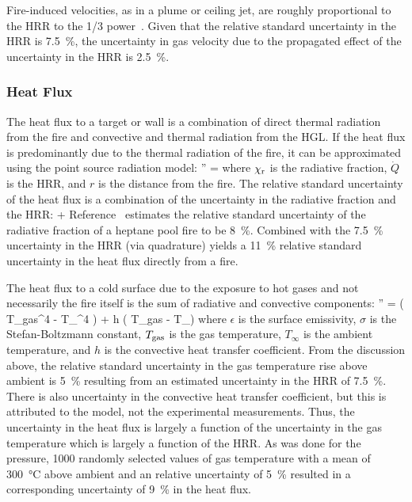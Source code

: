 Fire-induced velocities, as in a plume or ceiling jet, are roughly proportional to the HRR to the 1/3 power~\cite{SFPE:Alpert}. Given that the relative standard uncertainty in the HRR is 7.5~\%, the uncertainty in gas velocity due to the propagated effect of the uncertainty in the HRR is 2.5~\%.

\subsubsection{Heat Flux}

The heat flux to a target or wall is a combination of direct thermal radiation from the fire and convective and thermal radiation from the HGL. If the heat flux is predominantly due to the thermal radiation of the fire, it can be approximated using the point source radiation model:
\be
   '' = 
\ee
where $\chi_{\rm r}$ is the radiative fraction, $\dot{Q}$ is the HRR, and $r$ is the distance from the fire. The relative standard uncertainty of the heat flux is a combination of the uncertainty in the radiative fraction and the HRR:
\be
    \approx {} + 
\ee
Reference~\cite{Hamins:SP1013-1} estimates the relative standard uncertainty of the radiative fraction of a heptane pool fire to be 8~\%. Combined with the 7.5~\% uncertainty in the HRR (via quadrature) yields a 11~\% relative standard uncertainty in the heat flux directly from a fire.

The heat flux to a cold surface due to the exposure to hot gases and not necessarily the fire itself is the sum of radiative and convective components:
\be
   '' = \epsilon \sigma \left( T_{\rm gas}^4 - T_\infty^4 \right) + h \left( T_{\rm gas} - T_\infty \right)
\ee
where $\epsilon$ is the surface emissivity, $\sigma$ is the Stefan-Boltzmann constant, $T_{\rm gas}$  is the gas temperature, $T_\infty$ is the ambient temperature, and $h$ is the convective heat transfer coefficient. From the discussion above, the relative standard uncertainty in the gas temperature rise above ambient is 5~\% resulting from an estimated uncertainty in the HRR of 7.5~\%. There is also uncertainty in the convective heat transfer coefficient, but this is attributed to the model, not the experimental measurements. Thus, the uncertainty in the heat flux is largely a function of the uncertainty in the gas temperature which is largely a function of the HRR. As was done for the pressure, 1000 randomly selected values of gas temperature with a mean of 300~\unit{\degreeCelsius} above ambient and an relative uncertainty of 5~\% resulted in a corresponding uncertainty of 9~\% in the heat flux.

